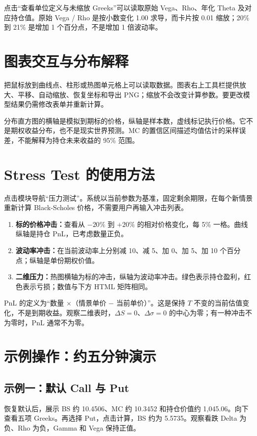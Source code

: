\documentclass[UTF8,a4paper,12pt]{ctexart}
\begin{document}
点击“查看单位定义与未缩放 Greeks”可以读取原始 Vega、Rho、年化 Theta 及对应持仓值。原始 Vega / Rho 是按小数变化 1.00 求导，而卡片按 0.01 缩放；20\% 到 21\% 是增加 1 个百分点，不是增加 1 倍波动率。

\section{图表交互与分布解释}
把鼠标放到曲线点、柱形或热图单元格上可以读取数据。图表右上工具栏提供放大、平移、自动缩放、恢复坐标和导出 PNG；缩放不会改变计算参数。要更改模型结果仍需修改表单并重新计算。

分布直方图的横轴是模拟到期标的价格，纵轴是样本数，虚线标记执行价格。它不是期权收益分布，也不是现实世界预测。MC 的置信区间描述均值估计的采样误差，不能解释为持仓未来收益的 95\% 范围。
\newpage

\section{Stress Test 的使用方法}
点击模块导航“压力测试”。系统以当前参数为基准，固定剩余期限，在每个新情景重新计算 Black-Scholes 价格，不需要用户再输入冲击列表。

\begin{enumerate}
\item \textbf{标的价格冲击：}查看从 $-20\%$ 到 $+20\%$ 的相对价格变化，每 5\% 一格。曲线纵轴是持仓 PnL，已考虑数量正负。
\item \textbf{波动率冲击：}在当前波动率上分别减 10、减 5、加 0、加 5、加 10 个百分点；纵轴是单份期权价值。
\item \textbf{二维压力：}热图横轴为标的冲击，纵轴为波动率冲击。绿色表示持仓盈利，红色表示亏损；数值与下方 HTML 矩阵相同。
\end{enumerate}

PnL 的定义为“数量 $\times$（情景单价 $-$ 当前单价）”。这是保持 $T$ 不变的当前估值变化，不是到期收益。观察二维表时，$\Delta S=0$、$\Delta\sigma=0$ 的中心为零；有一种冲击不为零时，PnL 通常不为零。


\section{示例操作：约五分钟演示}
\subsection*{示例一：默认 Call 与 Put}
恢复默认后，展示 BS 约 10.4506、MC 约 10.3452 和持仓价值约 1,045.06。向下查看五项 Greeks。再选择 Put，点击计算，BS 约为 5.5735。观察看跌 Delta 为负、Rho 为负，Gamma 和 Vega 保持正值。
\end{document}
